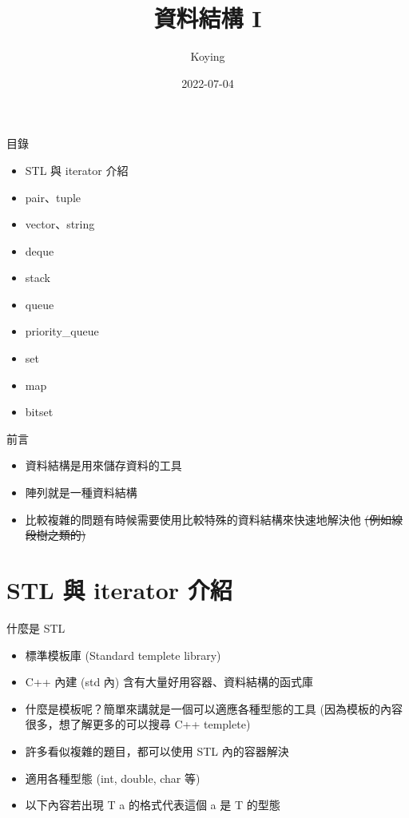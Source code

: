 \documentclass[aspectratio=169]{beamer}
\title{資料結構 I}
\author{Koying}
\date{2022-07-04}
\begin{document}
    \begin{frame}
        \titlepage
    \end{frame}

    \begin{frame}{目錄}
        \begin{itemize}
            \item STL 與 iterator 介紹
            \item pair、tuple
            \item vector、string
            \item deque
            \item stack
            \item queue
            \item priority\_queue
            \item set
            \item map
            \item bitset
        \end{itemize}
    \end{frame}
    
    \begin{frame}{前言}
        \begin{itemize}
            \item<1-> 資料結構是用來儲存資料的工具
            \item<2-> 陣列就是一種資料結構
            \item<3-> 比較複雜的問題有時候需要使用比較特殊的資料結構來快速地解決他 \sout{(例如線段樹之類的)}
        \end{itemize}
    \end{frame}

    \section{STL 與 iterator 介紹}

    \begin{frame}{什麼是 STL}
        \begin{itemize}
            \item<1-> 標準模板庫 (Standard templete library)
            \item<2-> C++ 內建 (std 內) 含有大量好用容器、資料結構的函式庫
            \item<3-> 什麼是模板呢？簡單來講就是一個可以適應各種型態的工具 (因為模板的內容很多，想了解更多的可以搜尋 C++ templete)
            \item<4-> 許多看似複雜的題目，都可以使用 STL 內的容器解決
            \item<5-> 適用各種型態 (int, double, char 等)
            \item<6-> 以下內容若出現 T a 的格式代表這個 a 是 T 的型態
        \end{itemize}
    \end{frame}
\end{document}
